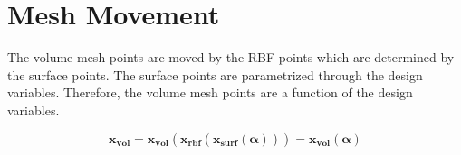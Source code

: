 \documentclass[letterpaper,12pt,]{article}
\begin{document}
\newcommand\del[2]
{%
\dfrac{\partial#1}{\partial#2}
}

\newcommand\Dt[2]
{%
\dfrac{d#1}{d#2}
}

\newcommand\mbf[1]
{%
\mathbf{#1}
}

\newcommand\mbs[1]
{%
\boldsymbol{#1}
}

\newcommand\xvol[0]
{%
\mbf{x_{vol}}
}

\newcommand\xsurf[0]
{%
\mbf{x_{surf}}
}

\newcommand\xrbf[0]
{%
\mbf{x_{rbf}}
}

\newcommand\balfa[0]
{%
\mbs{\alpha}
}

\newcommand\bR[0]
{%
\mbf{R}
}

\newcommand\bw[0]
{%
\mbf{w}
}

\newcommand\inv[1]
{%
\left[#1\right]^{-1}
}

\newcommand\sqbr[1]
{%
\left[#1\right]
}

\newcommand\nrbf[0]
{%
N_{rbf}
}

\newcommand\nxvol[0]
{%
N_{xvol}
}

\newcommand\ncell[0]
{%
N_{cell}
}

\newcommand\ndes[0]
{%
N_{des}
}

\newcommand\bpsi[0]
{%
\mbs{\psi}
}

\newcommand\blam[0]
{%
\mbs{\lambda}
}

\newcommand\smt[1]
{%
\text{\footnotesize$#1$}
}
\newcommand\sizealign[2]
{%
	&& \smt{\left[ #1 \times #2 \right]}
}

\section*{Mesh Movement}

The volume mesh points are moved by the RBF points which are determined by the surface points.
The surface points are parametrized through the design variables.
Therefore, the volume mesh points are a function of the design variables.

\begin{equation}
	\xvol 
	= 
	\xvol(
	\xrbf(
	\xsurf(
	\balfa))) 
	= 
	\xvol(\balfa)
\end{equation}
\end{document}
